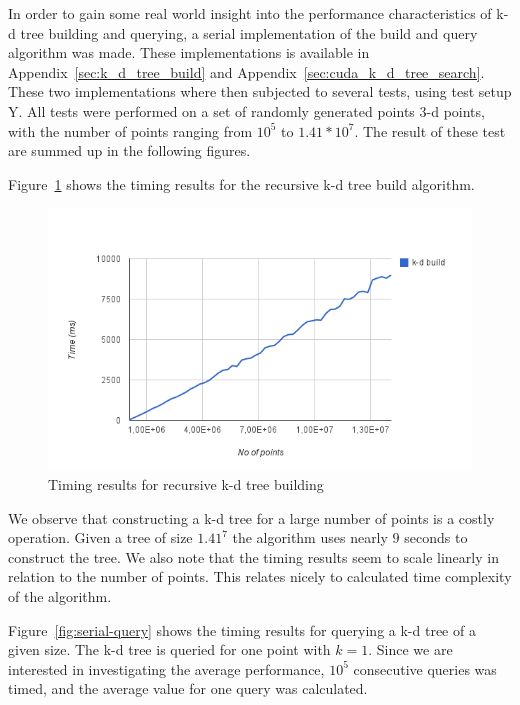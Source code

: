 In order to gain some real world insight into the performance characteristics of k-d tree building and querying, a serial implementation of the build and query algorithm was made. These implementations is available in Appendix~\ref{sec:k_d_tree_build} and Appendix~\ref{sec:cuda_k_d_tree_search}. These two implementations where then subjected to several tests, using test setup Y. All tests were performed on a set of randomly generated points 3-d points, with the number of points ranging from $10^5$ to $1.41*10^7$. The result of these test are summed up in the following figures.

Figure~\ref{fig:serial-build} shows the timing results for the recursive k-d tree build algorithm.

\begin{figure}[ht!]
    \centering
    \includegraphics[width=120mm]{../gfx/serial-build.png}
    \caption{Timing results for recursive k-d tree building}
    \label{fig:serial-build}
\end{figure}

We observe that constructing a k-d tree for a large number of points is a costly operation. Given a tree of size $1.41^7$ the algorithm uses nearly $9$ seconds to construct the tree. We also note that the timing results seem to scale linearly in relation to the number of points. This relates nicely to calculated time complexity of the algorithm.

Figure~\ref{fig:serial-query} shows the timing results for querying a k-d tree of a given size. The k-d tree is queried for one point with $k=1$. Since we are interested in investigating the average performance, $10^5$ consecutive queries was timed, and the average value for one query was calculated.

